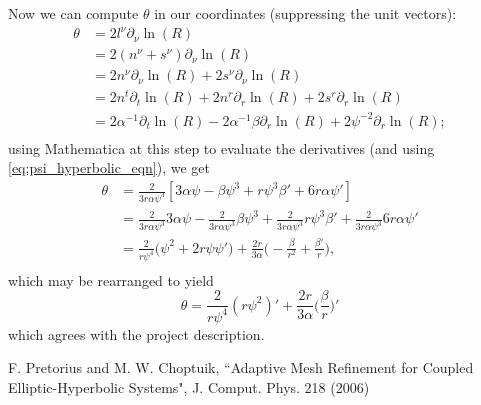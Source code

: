 \documentclass[12pt]{article}
\numberwithin{equation}{section}
\begin{document}
Now we can compute $\theta$ in our coordinates (suppressing the unit vectors):
\begin{equation}
\begin{aligned}
\theta &= 2 l^\nu \partial_\nu \ln(R) \\
&= 2 (n^\nu + s^\nu) \partial_\nu \ln(R) \\
&= 2 n^\nu \partial_\nu \ln(R) + 2 s^\nu \partial_\nu \ln(R) \\
&= 2 n^t \partial_t \ln(R) + 2 n^r \partial_r \ln(R) + 2 s^r \partial_r \ln(R) \\
&= 2 \alpha^{-1} \partial_t \ln(R) - 2 \alpha^{-1} \beta \partial_r \ln(R) + 2 \psi^{-2} \partial_r \ln(R); \\
\end{aligned}
\end{equation}
using Mathematica at this step to evaluate the derivatives (and using \ref{eq:psi_hyperbolic_eqn}), we get
\begin{equation}
\begin{aligned}
\theta &= \frac{2}{3 r \alpha \psi^3} [3 \alpha \psi - \beta \psi^3 + r \psi^3 \beta' + 6 r \alpha \psi'] \\
&= \frac{2}{3 r \alpha \psi^3} 3 \alpha \psi - \frac{2}{3 r \alpha \psi^3} \beta \psi^3 + \frac{2}{3 r \alpha \psi^3} r \psi^3 \beta' + \frac{2}{3 r \alpha \psi^3} 6 r \alpha \psi' \\
&= \frac{2}{r \psi^4} \Big( \psi^2 + 2 r \psi \psi' \Big) + \frac{2 r}{3 \alpha} \Big( - \frac{\beta}{r^2} + \frac{\beta'}{r} \Big), \\
\end{aligned}
\end{equation}
which may be rearranged to yield
\begin{equation}
\boxed{\theta = \frac{2}{r \psi^4} (r \psi^2)' + \frac{2 r}{3 \alpha} \Big( \frac{\beta}{r} \Big)' }
\end{equation}
which agrees with the project description.

\begin{thebibliography}{widestlabel}
	F. Pretorius and M. W. Choptuik, ``Adaptive Mesh Refinement for Coupled Elliptic-Hyperbolic Systems", J. Comput. Phys. 218 (2006)
\end{thebibliography}

\appendix
\end{document}
